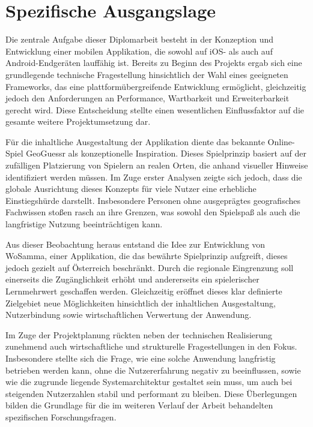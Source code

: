 \section{Spezifische Ausgangslage }\label{chapter:loesung1}

Die zentrale Aufgabe dieser Diplomarbeit besteht in der Konzeption und Entwicklung einer mobilen Applikation, die sowohl auf iOS- als auch auf Android-Endgeräten lauffähig ist. Bereits zu Beginn des Projekts ergab sich eine grundlegende technische Fragestellung hinsichtlich der Wahl eines geeigneten Frameworks, das eine plattformübergreifende Entwicklung ermöglicht, gleichzeitig jedoch den Anforderungen an Performance, Wartbarkeit und Erweiterbarkeit gerecht wird. Diese Entscheidung stellte einen wesentlichen Einflussfaktor auf die gesamte weitere Projektumsetzung dar.

Für die inhaltliche Ausgestaltung der Applikation diente das bekannte Online-Spiel GeoGuessr als konzeptionelle Inspiration. Dieses Spielprinzip basiert auf der zufälligen Platzierung von Spielern an realen Orten, die anhand visueller Hinweise identifiziert werden müssen. Im Zuge erster Analysen zeigte sich jedoch, dass die globale Ausrichtung dieses Konzepts für viele Nutzer eine erhebliche Einstiegshürde darstellt. Insbesondere Personen ohne ausgeprägtes geografisches Fachwissen stoßen rasch an ihre Grenzen, was sowohl den Spielspaß als auch die langfristige Nutzung beeinträchtigen kann.

Aus dieser Beobachtung heraus entstand die Idee zur Entwicklung von WoSamma, einer Applikation, die das bewährte Spielprinzip aufgreift, dieses jedoch gezielt auf Österreich beschränkt. Durch die regionale Eingrenzung soll einerseits die Zugänglichkeit erhöht und andererseits ein spielerischer Lernmehrwert geschaffen werden. Gleichzeitig eröffnet dieses klar definierte Zielgebiet neue Möglichkeiten hinsichtlich der inhaltlichen Ausgestaltung, Nutzerbindung sowie wirtschaftlichen Verwertung der Anwendung.

Im Zuge der Projektplanung rückten neben der technischen Realisierung zunehmend auch wirtschaftliche und strukturelle Fragestellungen in den Fokus. Insbesondere stellte sich die Frage, wie eine solche Anwendung langfristig betrieben werden kann, ohne die Nutzererfahrung negativ zu beeinflussen, sowie wie die zugrunde liegende Systemarchitektur gestaltet sein muss, um auch bei steigenden Nutzerzahlen stabil und performant zu bleiben. Diese Überlegungen bilden die Grundlage für die im weiteren Verlauf der Arbeit behandelten spezifischen Forschungsfragen.

